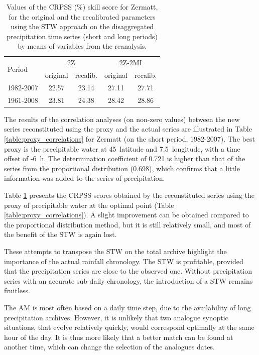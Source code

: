 \documentclass[hess]{copernicus}
\begin{document}
\begin{table}[htb]
	\caption{Values of the CRPSS (\%) skill score for Zermatt, for the original and the recalibrated parameters using the STW approach on the disaggregated precipitation time series (short and long periods) by means of variables from the reanalysis.}
	\begin{center}
		\begin{tabular}{l c c c c}
			\hline
			\multirow{2}{*}{Period} & \multicolumn{2}{c}{2Z} & \multicolumn{ 2}{c}{2Z-2MI} \\
			& original & recalib. & original & recalib. \\
			\hline
			1982-2007 & 22.57 & 23.14 & 27.11 & 27.71 \\
			1961-2008 & 23.81 & 24.38 & 28.42 & 28.86 \\
			\hline
		\end{tabular}
	\end{center}
	\label{table:proxy_CRPSS}
\end{table}

The results of the correlation analyses (on non-zero values) between the new series reconstituted using the proxy and the actual series are illustrated in Table \ref{table:proxy_correlations} for Zermatt (on the short period, 1982-2007). The best proxy is the precipitable water at 45\textdegree\ latitude and 7.5\textdegree\ longitude, with a time offset of -6~h. The determination coefficient of 0.721 is higher than that of the series from the proportional distribution (0.698), which confirms that a little information was added to the series of precipitation.

Table \ref{table:proxy_CRPSS} presents the CRPSS scores obtained by the reconstituted series using the proxy of precipitable water at the optimal point (Table \ref{table:proxy_correlations}). A slight improvement can be obtained compared to the proportional distribution method, but it is still relatively small, and most of the benefit of the STW is again lost.

These attempts to transpose the STW on the total archive highlight the importance of the actual rainfall chronology. The STW is profitable, provided that the precipitation series are close to the observed one. Without precipitation series with an accurate sub-daily chronology, the introduction of a STW remains fruitless.


\conclusions  %

The AM is most often based on a daily time step, due to the availability of long precipitation archives. However, it is unlikely that two analogue synoptic situations, that evolve relatively quickly, would correspond optimally at the same hour of the day. It is thus more likely that a better match can be found at another time, which can change the selection of the analogues dates.
\end{document}
